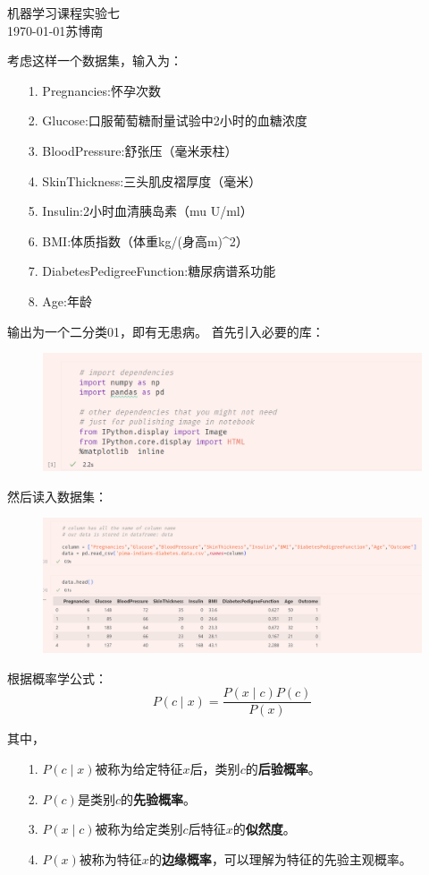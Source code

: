 \documentclass{article}
\begin{document}
\begin{center}
    \huge{机器学习课程实验七}\\
    \large{\today \quad 苏博南}
\end{center}

考虑这样一个数据集，输入为：
\begin{itemize}
	\item [1.] Pregnancies:怀孕次数
	\item [2.] Glucose:口服葡萄糖耐量试验中2小时的血糖浓度
	\item [3.] BloodPressure:舒张压（毫米汞柱）
	\item [4.] SkinThickness:三头肌皮褶厚度（毫米）
	\item [5.] Insulin:2小时血清胰岛素（mu U/ml）
	\item [6.] BMI:体质指数（体重kg/(身高m)\^{}2）
	\item [7.] DiabetesPedigreeFunction:糖尿病谱系功能
	\item [8.] Age:年龄 
\end{itemize} 
输出为一个二分类01，即有无患病。
首先引入必要的库：
\begin{figure}[H]
	\centering
	\includegraphics[width=\linewidth]{1.png}
\end{figure}

然后读入数据集：
\begin{figure}[H]
	\centering
	\includegraphics[width=\linewidth]{2.png}
\end{figure}

根据概率学公式：
$$
P(c\;|\;x)=\frac{P(x\;|\;c)P(c)}{P(x)}
$$

其中，\begin{itemize}
	\item [1.] $P(c\;|\;x)$被称为给定特征$x$后，类别$c$的\textbf{后验概率}。
	\item [2.] $P(c)$是类别$c$的\textbf{先验概率}。
	\item [3.] $P(x\;|\;c)$被称为给定类别$c$后特征$x$的\textbf{似然度}。
	\item [4.] $P(x)$被称为特征$x$的\textbf{边缘概率}，可以理解为特征的先验主观概率。
\end{itemize}
\end{document}
